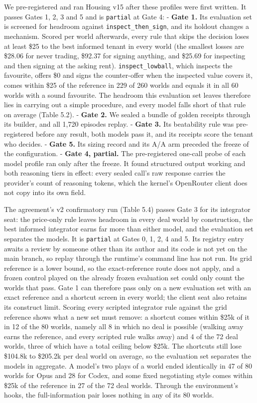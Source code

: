 We pre-registered and ran Housing v15 after these profiles were first written. It passes Gates 1, 2, 3 and 5 and is
\texttt{partial} at Gate 4:
- \textbf{Gate 1.} Its evaluation set is screened for headroom against \texttt{inspect\_\allowbreak{}then\_\allowbreak{}sign}, and its holdout changes a
mechanism. Scored per world afterwards, every rule that skips the decision loses at least \$25 to the best informed
tenant in every world (the smallest losses are \$28.06 for never trading, \$92.37 for signing anything, and \$25.69 for
inspecting and then signing at the asking rent). \texttt{inspect\_\allowbreak{}lowball}, which inspects the favourite, offers \$0 and signs
the counter-offer when the inspected value covers it, comes within \$25 of the reference in 229 of 260 worlds and
equals it in all 60 worlds with a sound favourite. The headroom this evaluation set leaves therefore lies in carrying
out a simple procedure, and every model falls short of that rule on average (Table 5.2).
- \textbf{Gate 2.} We sealed a bundle of golden receipts through its builder, and all 1,720 episodes replay.
- \textbf{Gate 3.} Its beatability rule was pre-registered before any result, both models pass it, and its receipts score
the tenant who decides.
- \textbf{Gate 5.} Its sizing record and its A/A arm preceded the freeze of the configuration.
- \textbf{Gate 4, partial.} The pre-registered one-call probe of each model profile ran only after the freeze. It found
structured output working and both reasoning tiers in effect: every sealed call's raw response carries the
provider's count of reasoning tokens, which the kernel's OpenRouter client does not copy into its own field.

The agreement's v2 confirmatory run (Table 5.4) passes Gate 3 for its integrator seat: the price-only rule leaves
headroom in every deal world by construction, the best informed integrator earns far more than either model, and the
evaluation set separates the models. It is \texttt{partial} at Gates 0, 1, 2, 4 and 5. Its registry entry awaits a review by
someone other than its author and its code is not yet on the main branch, so replay through the runtime's command line
has not run. Its grid reference is a lower bound, so the exact-reference route does not apply, and a frozen control played on the
already frozen evaluation set could only count the worlds that pass. Gate 1 can therefore pass only on a new
evaluation set with an exact reference and a shortcut screen in every world; the client seat also retains its
construct limit. Scoring every scripted integrator rule against the grid reference shows what a new set must remove: a shortcut comes within \$25k of it in 12 of the 80 worlds, namely all 8 in which no deal is possible (walking
away earns the reference, and every scripted rule walks away) and 4 of the 72 deal worlds, three of which have a total
ceiling below \$25k. The shortcuts still lose \$104.8k to \$205.2k per deal world on average, so the evaluation set
separates the models in aggregate. A model's two plays of a world ended identically in 47 of 80 worlds for Opus and 28
for Codex, and some fixed negotiating style comes within \$25k of the reference in 27 of the 72 deal worlds. Through the
environment's hooks, the full-information pair loses nothing in any of its 80 worlds.

